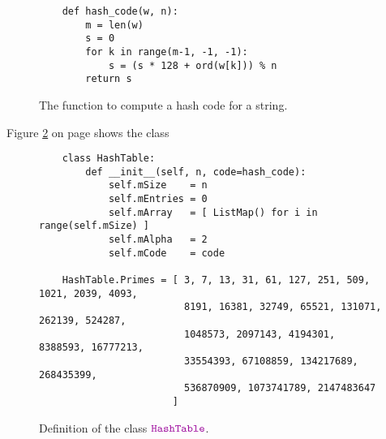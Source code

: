 \begin{figure}[!ht]
\centering
\begin{verbatim}
    def hash_code(w, n):
        m = len(w)
        s = 0
        for k in range(m-1, -1, -1):
            s = (s * 128 + ord(w[k])) % n
        return s
\end{verbatim}
\vspace*{-0.3cm}
\caption{The function  to compute a hash code for a string.}
\label{fig:hash_code.py}
\end{figure}


\noindent
Figure \ref{fig:HashMap.ipynb} on page \pageref{fig:HashMap.ipynb} shows the class 

\begin{figure}[!ht]
  \centering
\begin{verbatim}
    class HashTable:
        def __init__(self, n, code=hash_code):
            self.mSize    = n
            self.mEntries = 0                                        
            self.mArray   = [ ListMap() for i in range(self.mSize) ] 
            self.mAlpha   = 2                                        
            self.mCode    = code

    HashTable.Primes = [ 3, 7, 13, 31, 61, 127, 251, 509, 1021, 2039, 4093, 
                         8191, 16381, 32749, 65521, 131071, 262139, 524287, 
                         1048573, 2097143, 4194301, 8388593, 16777213, 
                         33554393, 67108859, 134217689, 268435399, 
                         536870909, 1073741789, 2147483647 
                       ]        
\end{verbatim}
\vspace*{-0.3cm}
  \caption{Definition of the class $\mytt{HashTable}$.}
  \label{fig:HashMap.ipynb}
\end{figure}

